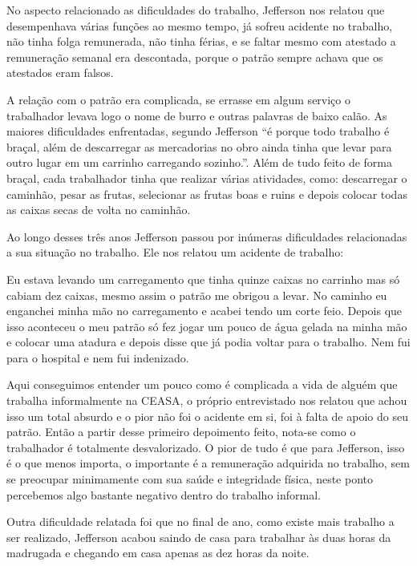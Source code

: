 No aspecto relacionado as dificuldades do trabalho, Jefferson nos relatou que desempenhava várias funções ao mesmo tempo, já sofreu acidente no trabalho, não tinha folga remunerada, não tinha férias, e se faltar mesmo com atestado a remuneração semanal era descontada, porque o patrão sempre achava que os atestados eram falsos.
 
A relação com o patrão era complicada, se errasse em algum serviço o trabalhador levava logo o nome de burro e outras palavras de baixo calão. As maiores dificuldades enfrentadas, segundo Jefferson ``é porque todo trabalho é braçal, além de descarregar as mercadorias no obro ainda tinha que levar para outro lugar em um carrinho carregando sozinho.''. Além de tudo feito de forma braçal, cada trabalhador tinha que realizar várias atividades, como: descarregar o caminhão, pesar as frutas, selecionar as frutas boas e ruins e depois colocar todas as caixas secas de volta no caminhão. 
 
 Ao longo desses três anos Jefferson passou por inúmeras dificuldades relacionadas a sua situação no trabalho. Ele nos relatou um acidente de trabalho: 
 
 \begin{citacao}
Eu estava levando um carregamento que tinha quinze caixas no carrinho mas só cabiam dez caixas, mesmo assim o patrão me obrigou a levar. No caminho eu enganchei minha mão no carregamento e acabei tendo um corte feio. Depois que isso aconteceu o meu patrão só fez jogar um pouco de água gelada na minha mão e colocar uma atadura e depois disse que já podia voltar para o trabalho. Nem fui para o hospital e nem fui indenizado.  
 \end{citacao}

Aqui conseguimos entender um pouco como é complicada a vida de alguém que trabalha informalmente na CEASA, o próprio entrevistado nos relatou que achou isso um total absurdo e o pior não foi o acidente em si, foi à falta de apoio do seu patrão. Então a partir desse primeiro depoimento feito, nota-se como o trabalhador é totalmente desvalorizado. O pior de tudo é que para Jefferson, isso é o que menos importa, o importante é a remuneração adquirida no trabalho, sem se preocupar minimamente com sua saúde e integridade física, neste ponto percebemos algo bastante negativo dentro do trabalho informal.

Outra dificuldade relatada foi que no final de ano, como existe mais trabalho a ser realizado, Jefferson acabou saindo de casa para trabalhar às duas horas da madrugada e chegando em casa apenas as dez horas da noite.

